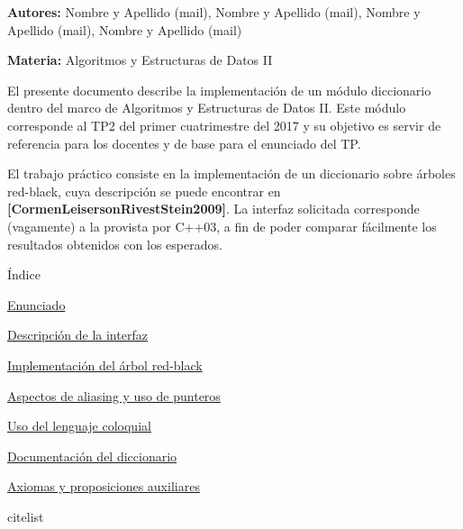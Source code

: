 
\begin{DoxyItemize}
\item {\bfseries Autores\+:} Nombre y Apellido (mail), Nombre y Apellido (mail), Nombre y Apellido (mail), Nombre y Apellido (mail)
\item {\bfseries Materia\+:} Algoritmos y Estructuras de Datos II
\end{DoxyItemize}

El presente documento describe la implementación de un módulo diccionario dentro del marco de Algoritmos y Estructuras de Datos II. Este módulo corresponde al T\+P2 del primer cuatrimestre del 2017 y su objetivo es servir de referencia para los docentes y de base para el enunciado del TP.

El trabajo práctico consiste en la implementación de un diccionario sobre árboles red-\/black, cuya descripción se puede encontrar en {\bfseries [Cormen\+Leiserson\+Rivest\+Stein2009]}. La interfaz solicitada corresponde (vagamente) a la provista por C++03, a fin de poder comparar fácilmente los resultados obtenidos con los esperados.

\begin{DoxyParagraph}{Índice}

\end{DoxyParagraph}

\begin{DoxyItemize}
\item \hyperlink{Enunciado}{Enunciado}
\item \hyperlink{Interfaz}{Descripción de la interfaz}
\item \hyperlink{Implementacion}{Implementación del árbol red-\/black}
\item \hyperlink{Aliasing}{Aspectos de aliasing y uso de punteros}
\item \hyperlink{Castellano}{Uso del lenguaje coloquial}
\item \hyperlink{classaed2_1_1map}{Documentación del diccionario }
\item \hyperlink{axiomas}{Axiomas y proposiciones auxiliares}
\item citelist 
\end{DoxyItemize}